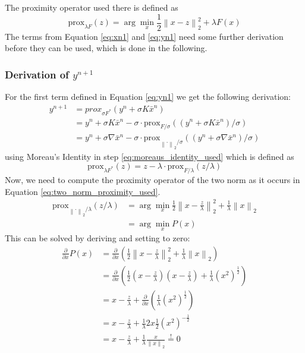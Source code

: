 \documentclass{paper}
\newcommand{\prox}{\text{prox}}
\newcommand{\twonorm}[1]{\left\lVert#1\right\rVert_2}
\begin{document}
The proximity operator used there is defined as 
\begin{equation}
	\prox_{\lambda F}(z) = \arg \min_x \frac{1}{2} \twonorm{x - z}^2 + \lambda F(x)
\end{equation}
The terms from Equation \eqref{eq:xn1} and \eqref{eq:yn1} need some further derivation
before they can be used, which is done in the following.

\subsubsection*{Derivation of $y^{n+1}$}
For the first term defined in Equation \eqref{eq:yn1} we get the following derivation:
\begin{align}
	y^{n+1} &= prox_{\sigma F^*}(y^n + \sigma K \bar{x}^n) \\
			&= y^n + \sigma K \bar{x}^n - 
				\sigma \cdot \prox_{F / \sigma}((y^n + \sigma K \bar{x}^n) / \sigma) 
				\label{eq:moreaus_identity_used} \\
			&= y^n + \sigma \nabla \bar{x}^n - 
				\sigma \cdot \prox_{\twonorm{\cdot} / \sigma}((y^n + \sigma \nabla \bar{x}^n) / \sigma)
				\label{eq:two_norm_proximity_used}
\end{align}
using Moreau's Identity in step \eqref{eq:moreaus_identity_used} which is defined as
\begin{equation}
	\prox_{\lambda F^*}(z) = z - \lambda \cdot \prox_{F/ \lambda}(z / \lambda) 
\end{equation}
Now, we need to compute the proximity operator of the two norm as it 
occurs in Equation \eqref{eq:two_norm_proximity_used}.
\begin{align}
	\prox_{\twonorm{\cdot} / \lambda}(z / \lambda) 
	&= \arg \min_x \frac{1}{2} \twonorm{x - \frac{z}{\lambda}}^2 +
	\frac{1}{\lambda} \twonorm{x} \\
	\label{eq:P_x}
	&= \arg \min_x P(x)
\end{align}
This can be solved by deriving and setting to zero:
\begin{align}
\frac{\partial}{\partial x} P(x) &= 
	\frac{\partial}{\partial x} \left(
 		\frac{1}{2} \twonorm{x - \frac{z}{\lambda}}^2 +
		\frac{1}{\lambda} \twonorm{x} 
	\right) \\
&= 
	\frac{\partial}{\partial x} \left(
		\frac{1}{2} (x-\frac{z}{\lambda}) (x-\frac{z}{\lambda}) + 
		\frac{1}{\lambda} (x^2)^{\frac{1}{2}}
	\right) \\
&= 
	x-\frac{z}{\lambda} + 
	\frac{\partial}{\partial x} \left(
		\frac{1}{\lambda} (x^2)^{\frac{1}{2}}
	\right) \\
&= 
	x-\frac{z}{\lambda} + 
	\frac{1}{\lambda} 2x \frac{1}{2} (x^2)^{-\frac{1}{2}} \\
&= 
	x-\frac{z}{\lambda} + 
	\frac{1}{\lambda} \frac{x}{\twonorm{x}} \overset{!}{=} 0 
	\label{eq:proximity_operator_l2_norm_fail}
\end{align}
\end{document}
